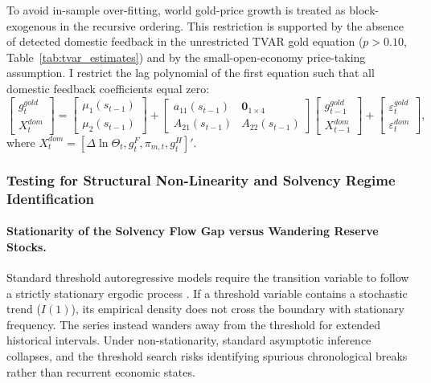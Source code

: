 To avoid in-sample over-fitting, world gold-price growth is treated as block-exogenous in the recursive ordering. This restriction is supported by the absence of detected domestic feedback in the unrestricted TVAR gold equation ($p > 0.10$, Table~\ref{tab:tvar_estimates}) and by the small-open-economy price-taking assumption. I restrict the lag polynomial of the first equation such that all domestic feedback coefficients equal zero:
\begin{equation}
    \begin{bmatrix} g^{gold}_t \\ X^{dom}_t \end{bmatrix} = \begin{bmatrix} \mu_1(s_{t-1}) \\ \mu_2(s_{t-1}) \end{bmatrix} + \begin{bmatrix} a_{11}(s_{t-1}) & \mathbf{0}_{1 \times 4} \\ A_{21}(s_{t-1}) & A_{22}(s_{t-1}) \end{bmatrix} \begin{bmatrix} g^{gold}_{t-1} \\ X^{dom}_{t-1} \end{bmatrix} + \begin{bmatrix} \varepsilon^{gold}_t \\ \varepsilon^{dom}_t \end{bmatrix},
    \label{eq:tvar_block_exogeneity_matrix}
\end{equation}
where $X^{dom}_t = [\Delta \ln \Theta_t, g^F_t, \pi_{m,t}, g^H_t]'$. 


\subsubsection{Testing for Structural Non-Linearity and Solvency Regime Identification}
\label{sec:tvar_threshold_estimation}

\paragraph{Stationarity of the Solvency Flow Gap versus Wandering Reserve Stocks.}
Standard threshold autoregressive models require the transition variable to follow a strictly stationary ergodic process \citep{Hansen1997,Hansen2000}. If a threshold variable contains a stochastic trend ($I(1)$), its empirical density does not cross the boundary with stationary frequency. The series instead wanders away from the threshold for extended historical intervals. Under non-stationarity, standard asymptotic inference collapses, and the threshold search risks identifying spurious chronological breaks rather than recurrent economic states.

